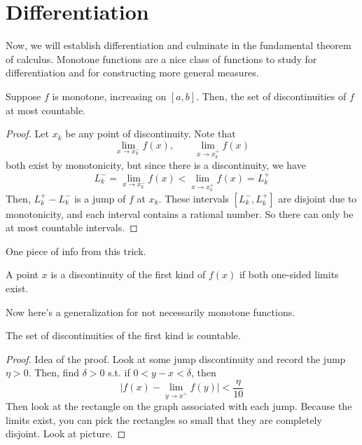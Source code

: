 \section{Differentiation}

  Now, we will establish differentiation and culminate in the fundamental theorem of calculus. Monotone functions are a nice class of functions to study for differentiation and for constructing more general measures. 

  \begin{theorem}
    Suppose $f$ is monotone, increasing on $[a, b]$. Then, the set of discontinuities of $f$ at most countable. 
  \end{theorem}
  \begin{proof}
    Let $x_k$ be any point of discontinuity. Note that 
    \begin{equation}
      \lim_{x \to x_k^-} f(x), \qquad \lim_{x \to x_k^+} f(x)
    \end{equation}
    both exist by monotonicity, but since there is a discontinuity, we have 
    \begin{equation}
      L_k^- = \lim_{x \to x_k^-} f(x) < \lim_{x \to x_k^+} f(x) = L_k^+
    \end{equation}
    Then, $L_k^+ - L_k^-$ is a jump of $f$ at $x_k$. These intervals $[L_k^-, L_k^+]$ are disjoint due to monotonicity, and each interval contains a rational number. So there can only be at most countable intervals. 
  \end{proof}

  One piece of info from this trick. 

  \begin{definition}
    A point $x$ is a discontinuity of the first kind of $f(x)$ if both one-sided limits exist. 
  \end{definition}

  Now here's a generalization for not necessarily monotone functions. 

  \begin{theorem}[Detour]
    The set of discontinuities of the first kind is countable. 
  \end{theorem}
  \begin{proof}
    Idea of the proof. Look at some jump discontinuity and record the jump $\eta > 0$. Then, find $\delta > 0$ s.t. if $0 < y - x < \delta$, then 
    \begin{equation}
      \big| f(x)  - \lim_{y \to x^+} f(y) \big|  < \frac{\eta}{10}
    \end{equation}
    Then look at the rectangle on the graph associated with each jump. Because the limits exist, you can pick the rectangles so small that they are completely disjoint. Look at picture. 
  \end{proof}

